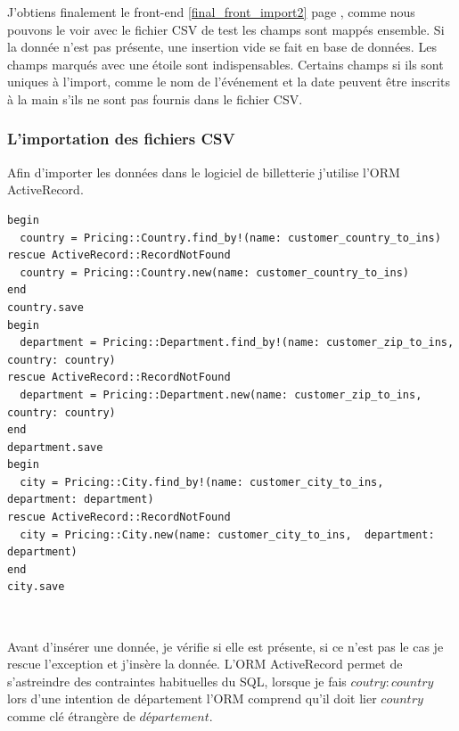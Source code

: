 J'obtiens finalement le front-end \ref{final_front_import2} page \pageref{final_front_import2}, comme nous pouvons le voir avec le fichier CSV de test les champs sont mappés ensemble. Si la donnée n'est pas présente, une insertion vide se fait en base de données. Les champs marqués avec une étoile sont indispensables. Certains champs si ils sont uniques à l'import, comme le nom de l'événement et la date peuvent être inscrits à la main s’ils ne sont pas fournis dans le fichier CSV.


\subsubsection{L'importation des fichiers CSV}

Afin d'importer les données dans le logiciel de billetterie j'utilise l'ORM ActiveRecord.

\lstset{style=customruby}
\begin{lstlisting}
begin
  country = Pricing::Country.find_by!(name: customer_country_to_ins)
rescue ActiveRecord::RecordNotFound 
  country = Pricing::Country.new(name: customer_country_to_ins)
end
country.save
begin
  department = Pricing::Department.find_by!(name: customer_zip_to_ins, country: country)
rescue ActiveRecord::RecordNotFound
  department = Pricing::Department.new(name: customer_zip_to_ins,  country: country)
end
department.save
begin
  city = Pricing::City.find_by!(name: customer_city_to_ins, department: department)
rescue ActiveRecord::RecordNotFound
  city = Pricing::City.new(name: customer_city_to_ins,  department: department)
end
city.save
\end{lstlisting}
\leavevmode \

Avant d'insérer une donnée, je vérifie si elle est présente, si ce n'est pas le cas je rescue l'exception et j'insère la donnée. 
L'ORM ActiveRecord permet de s'astreindre des contraintes habituelles du SQL, lorsque je fais $coutry: country$ lors d'une intention de département l'ORM comprend qu'il doit lier $country$ comme clé étrangère de $département$.

